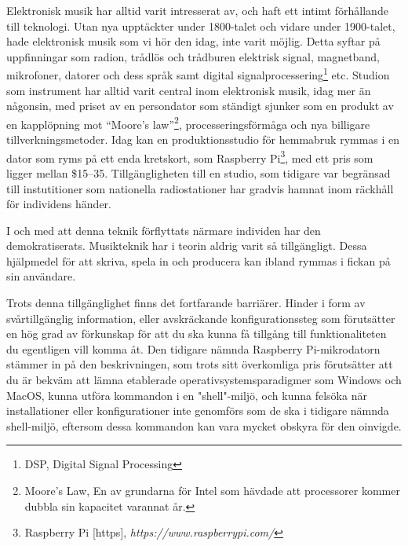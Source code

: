 \documentclass{article}
\begin{document}
Elektronisk musik har alltid varit intresserat av, och haft ett intimt förhållande till teknologi. Utan nya
upptäckter under 1800-talet och vidare under 1900-talet, hade elektronisk musik som vi hör den idag, inte
varit möjlig. Detta syftar på uppfinningar som radion, trådlös och trådburen elektrisk signal,
magnetband, mikrofoner, datorer och dess språk samt digital signalprocessering\footnote{DSP, Digital Signal
Processing} etc. Studion som instrument 
har alltid varit central inom elektronisk musik, idag mer än
någonsin, med priset av en persondator som ständigt sjunker som en produkt av en kapplöpning mot ``Moore's
law''\footnote{Moore's Law, En av grundarna för Intel som hävdade att processorer kommer dubbla sin kapacitet
varannat år.}, processeringsförmåga och nya billigare tillverkningsmetoder. Idag kan
en produktionsstudio för hemmabruk rymmas i en dator som ryms på ett enda kretskort, som Raspberry
Pi\footnote{Raspberry Pi [https], \emph{https://www.raspberrypi.com/}}, med ett pris som ligger mellan \$15–35. Tillgängligheten till en studio, som tidigare var begränsad till instutitioner som nationella
radiostationer har gradvis hamnat inom räckhåll för individens händer.

I och med att denna teknik förflyttats närmare individen har den demokratiserats. Musikteknik har i teorin
aldrig varit så tillgängligt. Dessa hjälpmedel för att skriva, spela in och producera kan ibland rymmas i
fickan på sin användare.

Trots denna tillgänglighet finns det fortfarande barriärer. Hinder i form av svårtillgänglig information,
eller avskräckande konfigurationssteg som förutsätter en hög grad av förkunskap för att du ska kunna få
tillgång till funktionaliteten du egentligen vill komma åt. Den tidigare nämnda
Raspberry Pi-mikrodatorn stämmer in på den beskrivningen, som trots sitt överkomliga pris förutsätter att du
är bekväm att lämna etablerade operativsystemsparadigmer som Windows och MacOS, kunna utföra kommandon i en
"shell"-miljö, och kunna felsöka när installationer eller konfigurationer inte genomförs som de ska i tidigare
nämnda shell-miljö, eftersom dessa kommandon kan vara mycket obskyra för den oinvigde.
	
\end{document}
